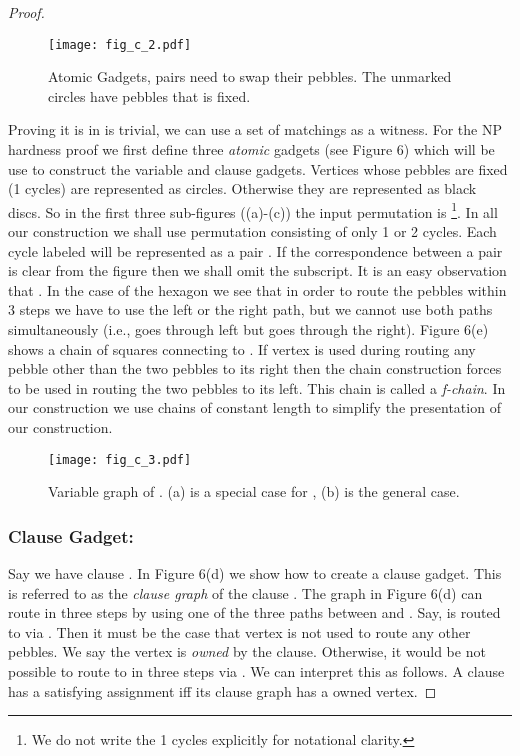 \documentclass[runningheads,a4paper]{llncs}
\begin{document}
\begin{proof}
	\begin{figure}[h]
		\texttt{[image: fig\_c\_2.pdf]}
		\centering
		\caption{Atomic Gadgets, pairs  need to swap their pebbles. The unmarked circles have pebbles that is fixed.} 
	\end{figure}
	Proving it is in  is trivial, we can use a set of matchings as a witness. For the NP hardness proof we first define three \textit{atomic} gadgets (see Figure 6) which will be use to construct the variable and clause gadgets. Vertices whose pebbles are fixed (1 cycles) are represented as circles.  Otherwise they are represented as black discs. So in the first three sub-figures ((a)-(c)) the input permutation is \footnote{We do not write the 1 cycles explicitly for notational clarity.}. In all our construction we shall use permutation consisting of only 1 or 2 cycles. Each cycle labeled  will be represented as a pair . If the correspondence between a pair is clear from the figure then we shall omit the subscript.  It is an easy observation that . In the case of the hexagon  we see that in order to route the pebbles within 3 steps we have to use the left or the right path, but we cannot use both paths simultaneously (i.e.,  goes through left but  goes through the right). Figure 6(e) shows a chain of squares connecting  to . If vertex  is used during routing any pebble other than the two pebbles to its right then the chain construction forces  to be used in routing the two pebbles to its left. This chain is called a \textit{f-chain}. In our construction we  use chains of constant length to simplify the presentation of our construction.  
	\begin{figure}[h]
		\texttt{[image: fig\_c\_3.pdf]}
		\centering
		\caption{Variable graph of . (a) is a special case for , (b) is the general case.} 
	\end{figure}
	\subsubsection{Clause Gadget:} Say we have clause . In Figure 6(d) we show how to create a clause gadget. This is referred to as the \textit{clause graph}  of the clause . The graph in Figure 6(d) can route  in three steps by using one of the three paths between  and . Say,  is routed to  via . Then it must be the case that vertex  is not used to route any other pebbles. We say the vertex  is \textit{owned} by the clause. Otherwise, it would be not possible to route  to  in three steps via . We can interpret this as follows. A clause has a satisfying assignment iff its clause graph has a owned vertex.
	

\end{proof}
\end{document}
